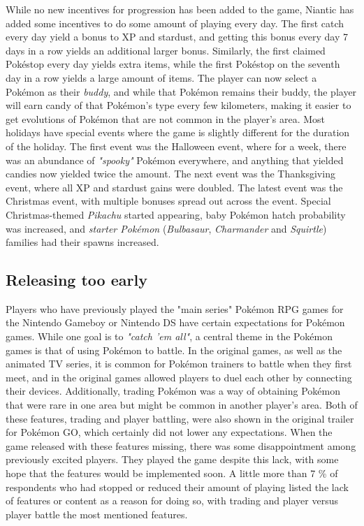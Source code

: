 While no new incentives for progression has been added to the game, Niantic has added some incentives to do some amount of playing every day. The first catch every day yield a bonus to XP and stardust, and getting this bonus every day 7 days in a row yields an additional larger bonus. Similarly, the first claimed Pokéstop every day yields extra items, while the first Pokéstop on the seventh day in a row yields a large amount of items. The player can now select a Pokémon as their \emph{buddy}, and while that Pokémon remains their buddy, the player will earn candy of that Pokémon's type every few kilometers, making it easier to get evolutions of Pokémon that are not common in the player's area. Most holidays have special events where the game is slightly different for the duration of the holiday. The first event was the Halloween event, where for a week, there was an abundance of \emph{"spooky"} Pokémon everywhere, and anything that yielded candies now yielded twice the amount. The next event was the Thanksgiving event, where all XP and stardust gains were doubled. The latest event was the Christmas event, with multiple bonuses spread out across the event. Special Christmas-themed \emph{Pikachu} started appearing, baby Pokémon hatch probability was increased, and \emph{starter Pokémon} (\emph{Bulbasaur}, \emph{Charmander} and \emph{Squirtle}) families had their spawns increased.

\begin{figure}[h]
	\centering
	\caption{}
\end{figure}


\subsection{Releasing too early}
Players who have previously played the "main series" Pokémon RPG games for the Nintendo Gameboy or Nintendo DS have certain expectations for Pokémon games. While one goal is to \emph{"catch 'em all"}, a central theme in the Pokémon games is that of using Pokémon to battle. In the original games, as well as the animated TV series, it is common for Pokémon trainers to battle when they first meet, and in the original games allowed players to duel each other by connecting their devices. Additionally, trading Pokémon was a way of obtaining Pokémon that were rare in one area but might be common in another player's area. Both of these features, trading and player battling, were also shown in the original trailer for Pokémon GO, which certainly did not lower any expectations. When the game released with these features missing, there was some disappointment among previously excited players. They played the game despite this lack, with some hope that the features would be implemented soon. A little more than 7 \% of respondents who had stopped or reduced their amount of playing listed the lack of features or content as a reason for doing so, with trading and player versus player battle the most mentioned features.

